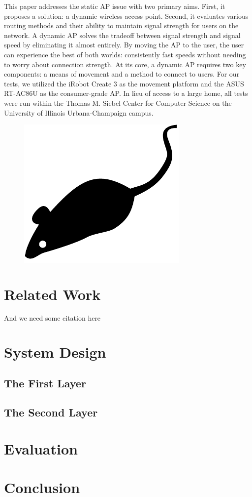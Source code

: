 This paper addresses the static AP issue with two primary aims. First, it proposes a solution: a dynamic wireless access point. Second, it evaluates various routing methods and their ability to maintain signal strength for users on the network. A dynamic AP solves the tradeoff between signal strength and signal speed by eliminating it almost entirely. By moving the AP to the user, the user can experience the best of both worlds: consistently fast speeds without needing to worry about connection strength. At its core, a dynamic AP requires two key components: a means of movement and a method to connect to users. For our tests, we utilized the iRobot Create 3 as the movement platform and the ASUS RT-AC86U as the consumer-grade AP. In lieu of access to a large home, all tests were run within the Thomas M. Siebel Center for Computer Science on the University of Illinois Urbana-Champaign campus. 


\begin{figure}[tp]
\centering
\includegraphics{figures/mouse}
\caption{\blindtext}
\end{figure}

\section{Related Work}
\blindtext

And we need some citation here\cite{floyd1993random, stoica2001chord}

\Blindtext

\section{System Design}

\subsection{The First Layer}
\Blindtext

\subsection{The Second Layer}
\Blindtext

\section{Evaluation}
\Blindtext

\section{Conclusion}
\blindtext

